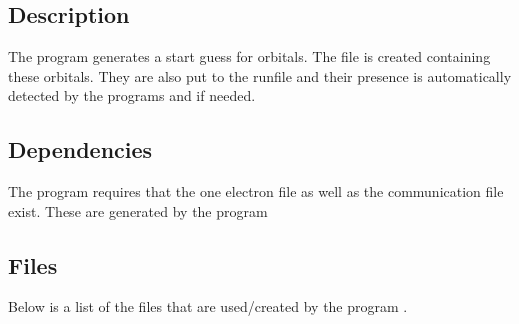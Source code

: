 
\section{}
\label{UG:sec:guessorb}

\subsection{Description}
\label{UG:sec:guessorb_description}

The  program generates a start guess for orbitals.
The file  is created containing these orbitals.
They are also put to the runfile and their presence is automatically
detected by the programs  and 
if needed.

\subsection{Dependencies}
\label{UG:sec:guessorb_dependencies}
The  program requires that the one electron
file  as well as the communication file
 exist. These are generated by the program 

\subsection{Files}
\label{UG:sec:guessorb_files}

Below is a list of the files that are used/created by the program
.

